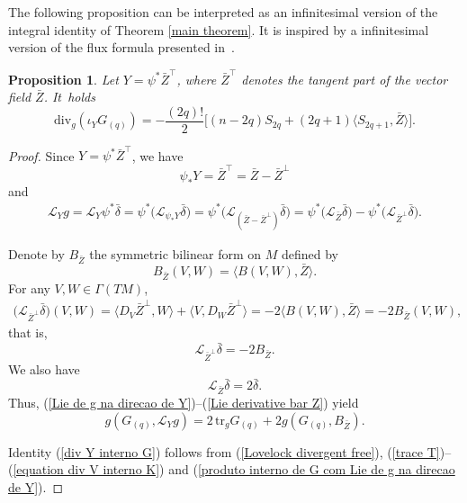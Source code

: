 \documentclass[pdftex]{sigma}
\numberwithin{equation}{section}
\newtheorem{Proposition}[Theorem]{Proposition}
\begin{document}
The following proposition can be interpreted as an infinitesimal version
of the integral identity of Theorem \ref{main theorem}. It is inspired by a
infinitesimal version of the flux formula presented in~\mbox{\cite[equation (8.4)]{AliasConstanthigherordermean2006}}.

\begin{Proposition}
 Let $Y = \psi^\ast \bar{Z}^\top$, where $\bar{Z}^\top$ denotes the tangent part of the vector field \(\bar{Z}\). It~holds
  \begin{equation} \label{div Y interno G}
   \mathrm{div}_g(\iota_YG_{(q)}) = -\frac{(2q)!}{2} \bigl[ (n-2q)S_{2q} + (2q + 1) \bigl\langle S_{2q+1}, \bar{Z} \bigr\rangle \bigr].  \end{equation}
\end{Proposition}
\begin{proof}
  Since $Y = \psi^\ast \bar{Z}^\top$, we have
\begin{equation*}
  \psi_\ast Y = \bar{Z}^\top = \bar{Z} - \bar{Z}^\perp
\end{equation*}
and
\begin{align}
\mathcal{L}_Yg  = \mathcal{L}_Y\psi^\ast \bar{\delta}
 = \psi^\ast \bigl( \mathcal{L}_{\psi_\ast Y}\bar{\delta}\bigr)
 = \psi^\ast \bigl( \mathcal{L}_{(\bar{Z} - \bar{Z}^\perp)} \bar{\delta} \bigr)
 = \psi^\ast \bigl( \mathcal{L}_{\bar{Z}} \bar{\delta}\bigr) - \psi^\ast \bigl( \mathcal{L}_{\bar{Z}^\perp}\bar{\delta}\bigr). \label{Lie de g na direcao de Y}
\end{align}

Denote by $B_{\bar{Z}}$ the symmetric bilinear form on $M$ defined by
\begin{equation*}
 B_{\bar{Z}}(V,W) = \bigl\langle B(V,W), \bar{Z} \bigr\rangle.
\end{equation*}
For any $V,W \in \Gamma(TM)$,
\begin{align*}
 \bigl( \mathcal{L}_{\bar{Z}^\perp} \bar{\delta} \bigr) (V,W) = \bigl\langle D_V \bar{Z}^\perp, W \bigr\rangle + \bigl\langle V, D_W \bar{Z}^\perp \bigr\rangle = - 2 \bigl\langle B(V,W), \bar{Z} \bigr\rangle
  = - 2B_{\bar{Z}}(V,W),
\end{align*}
that is,
\begin{equation} \label{Lie derivative bar Z-perp}
 \mathcal{L}_{\bar{Z}^\perp} \bar{\delta} = -2B_{\bar{Z}}.
\end{equation}
We also have
\begin{equation} \label{Lie derivative bar Z}
 \mathcal{L}_{\bar{Z}}\bar{\delta} = 2\bar{\delta}.
\end{equation}
Thus, (\ref{Lie de g na direcao de Y})--(\ref{Lie derivative bar Z}) yield
\begin{equation} \label{produto interno de G com Lie de g na direcao de Y}
 g(G_{(q)}, \mathcal{L}_Yg) = 2 \, \mathrm{tr}_gG_{(q)} + 2g  (G_{(q)},B_{\bar{Z}} ).
\end{equation}

Identity (\ref{div Y interno G}) follows from (\ref{Lovelock divergent free}), (\ref{trace T})--(\ref{equation div V interno K}) and (\ref{produto interno de G com Lie de g na direcao de Y}).
\end{proof}
\end{document}
